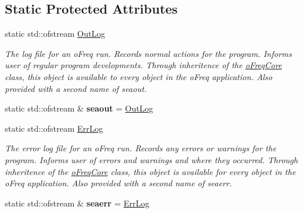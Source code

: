 \subsection*{Static Protected Attributes}
\begin{DoxyCompactItemize}
\item 
\hypertarget{classosea_1_1ofreq_1_1o_freq_core_a85b3e812b6d78c064ba375d5101bb053}{static std\-::ofstream \hyperlink{classosea_1_1ofreq_1_1o_freq_core_a85b3e812b6d78c064ba375d5101bb053}{Out\-Log}}\label{classosea_1_1ofreq_1_1o_freq_core_a85b3e812b6d78c064ba375d5101bb053}

\begin{DoxyCompactList}\small\item\em The log file for an o\-Freq run. Records normal actions for the program. Informs user of regular program developments. Through inheritence of the \hyperlink{classosea_1_1ofreq_1_1o_freq_core}{o\-Freq\-Core} class, this object is available to every object in the o\-Freq application. Also provided with a second name of seaout. \end{DoxyCompactList}\item 
\hypertarget{classosea_1_1ofreq_1_1o_freq_core_ad1092650d598d7f30e7c0fb3dbdfd392}{static std\-::ofstream \& {\bfseries seaout} = \hyperlink{classosea_1_1ofreq_1_1o_freq_core_a85b3e812b6d78c064ba375d5101bb053}{Out\-Log}}\label{classosea_1_1ofreq_1_1o_freq_core_ad1092650d598d7f30e7c0fb3dbdfd392}

\item 
\hypertarget{classosea_1_1ofreq_1_1o_freq_core_a5e31044ee80fa436289e569c8080b21e}{static std\-::ofstream \hyperlink{classosea_1_1ofreq_1_1o_freq_core_a5e31044ee80fa436289e569c8080b21e}{Err\-Log}}\label{classosea_1_1ofreq_1_1o_freq_core_a5e31044ee80fa436289e569c8080b21e}

\begin{DoxyCompactList}\small\item\em The error log file for an o\-Freq run. Records any errors or warnings for the program. Informs user of errors and warnings and where they occurred. Through inheritence of the \hyperlink{classosea_1_1ofreq_1_1o_freq_core}{o\-Freq\-Core} class, this object is available for every object in the o\-Freq application. Also provided with a second name of seaerr. \end{DoxyCompactList}\item 
\hypertarget{classosea_1_1ofreq_1_1o_freq_core_aec5a7ac06574b9c5f80ac3c149c09fda}{static std\-::ofstream \& {\bfseries seaerr} = \hyperlink{classosea_1_1ofreq_1_1o_freq_core_a5e31044ee80fa436289e569c8080b21e}{Err\-Log}}\label{classosea_1_1ofreq_1_1o_freq_core_aec5a7ac06574b9c5f80ac3c149c09fda}

\end{DoxyCompactItemize}


